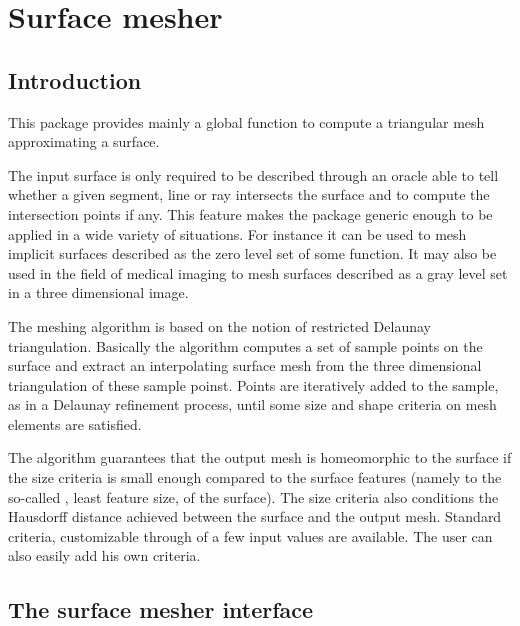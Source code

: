 \chapter{Surface mesher}
\label{chapter_SurfaceMesher}

\vspace*{-15mm}
\minitoc
\vspace*{30mm}

\section{Introduction}
\label{SurfaceMesher_section_intro}

This package provides mainly a global function
to compute a triangular mesh approximating a surface.

The input surface is only required to be described
 through an oracle able to  tell whether a
given segment, line or ray intersects the surface
and to compute the intersection points if any.
This feature makes the package generic enough to be
applied in a wide variety of situations. For instance it can be
used to mesh implicit surfaces described as the zero level set
of some function. It may also be used in the field of medical imaging
to mesh surfaces described as a gray
level set in a three dimensional image.


The meshing algorithm is based on the notion of restricted
Delaunay triangulation. Basically the algorithm  computes a set of
sample points on the surface and extract an interpolating 
surface mesh  from the three dimensional triangulation of these 
sample poinst. Points are iteratively added to the sample,
as in a Delaunay refinement process, until some size and shape
criteria on mesh elements are satisfied. 

The algorithm guarantees that the output mesh is homeomorphic to the
surface
if the size criteria is small enough compared to the surface features
(namely to the so-called , least feature size, of the
surface).
The size criteria also conditions the Hausdorff distance achieved
between the surface and the output mesh.  Standard criteria,
customizable through of a few input values are available.
The user can also easily add his own criteria.  



\section{The surface mesher interface}
\label{SurfaceMesher_section_interface}

